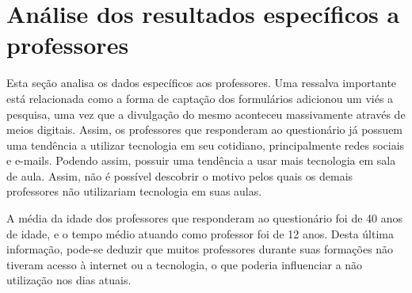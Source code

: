 \section{Análise dos resultados específicos a professores}

Esta seção analisa os dados específicos aos professores. Uma ressalva importante está relacionada como a forma de captação dos formulários adicionou um viés a pesquisa, uma vez que a divulgação do mesmo aconteceu massivamente através de meios digitais.  Assim, os professores que responderam ao questionário já possuem uma tendência a utilizar tecnologia em seu cotidiano, principalmente redes sociais e e-mails. Podendo assim, possuir uma tendência a usar mais tecnologia em sala de aula. Assim, não é possível descobrir o motivo pelos quais os demais professores não utilizariam tecnologia em suas aulas.

A média da idade dos professores que responderam ao questionário foi de 40 anos de idade, e o tempo médio atuando como professor foi de 12 anos. Desta última informação, pode-se deduzir que muitos professores durante suas formações não tiveram acesso à internet ou a tecnologia, o que poderia influenciar a não utilização nos dias atuais.

